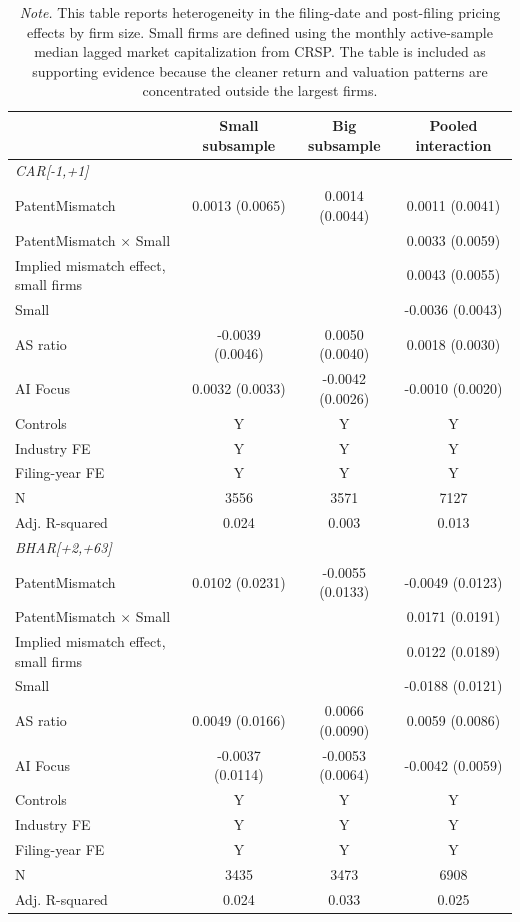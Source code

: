 \begin{table}[!htbp]
\centering
\small
\caption{Size heterogeneity in filing-date and post-filing mismatch effects}
\label{tab:appendix_size_heterogeneity}
\begin{tabular}{lccc}
\hline
 & Small subsample & Big subsample & Pooled interaction \\
\hline
\multicolumn{4}{l}{\textit{CAR[-1,+1]}} \\
PatentMismatch & 0.0013 (0.0065) & 0.0014 (0.0044) & 0.0011 (0.0041) \\
PatentMismatch × Small &  &  & 0.0033 (0.0059) \\
Implied mismatch effect, small firms &  &  & 0.0043 (0.0055) \\
Small &  &  & -0.0036 (0.0043) \\
AS ratio & -0.0039 (0.0046) & 0.0050 (0.0040) & 0.0018 (0.0030) \\
AI Focus & 0.0032 (0.0033) & -0.0042 (0.0026) & -0.0010 (0.0020) \\
Controls & Y & Y & Y \\
Industry FE & Y & Y & Y \\
Filing-year FE & Y & Y & Y \\
N & 3556 & 3571 & 7127 \\
Adj. R-squared & 0.024 & 0.003 & 0.013 \\
\multicolumn{4}{l}{\textit{BHAR[+2,+63]}} \\
PatentMismatch & 0.0102 (0.0231) & -0.0055 (0.0133) & -0.0049 (0.0123) \\
PatentMismatch × Small &  &  & 0.0171 (0.0191) \\
Implied mismatch effect, small firms &  &  & 0.0122 (0.0189) \\
Small &  &  & -0.0188 (0.0121) \\
AS ratio & 0.0049 (0.0166) & 0.0066 (0.0090) & 0.0059 (0.0086) \\
AI Focus & -0.0037 (0.0114) & -0.0053 (0.0064) & -0.0042 (0.0059) \\
Controls & Y & Y & Y \\
Industry FE & Y & Y & Y \\
Filing-year FE & Y & Y & Y \\
N & 3435 & 3473 & 6908 \\
Adj. R-squared & 0.024 & 0.033 & 0.025 \\
\hline
\end{tabular}
\caption*{\footnotesize \textit{Note.} This table reports heterogeneity in the filing-date and post-filing pricing effects by firm size. Small firms are defined using the monthly active-sample median lagged market capitalization from CRSP. The table is included as supporting evidence because the cleaner return and valuation patterns are concentrated outside the largest firms.}
\end{table}
